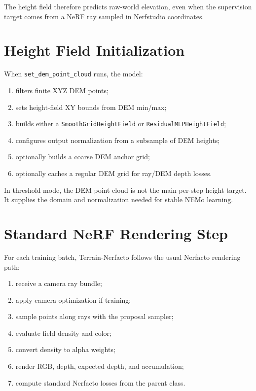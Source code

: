 \documentclass[11pt]{article}
\begin{document}
The height field therefore predicts raw-world elevation, even when the supervision target comes from a NeRF ray sampled in Nerfstudio coordinates.

\section{Height Field Initialization}

When \texttt{set\_dem\_point\_cloud} runs, the model:

\begin{enumerate}[leftmargin=*]
  \item filters finite XYZ DEM points;
  \item sets height-field XY bounds from DEM min/max;
  \item builds either a \texttt{SmoothGridHeightField} or \texttt{ResidualMLPHeightField};
  \item configures output normalization from a subsample of DEM heights;
  \item optionally builds a coarse DEM anchor grid;
  \item optionally caches a regular DEM grid for ray/DEM depth losses.
\end{enumerate}

In threshold mode, the DEM point cloud is not the main per-step height target. It supplies the domain and normalization needed for stable NEMo learning.

\section{Standard NeRF Rendering Step}

For each training batch, Terrain-Nerfacto follows the usual Nerfacto rendering path:

\begin{enumerate}[leftmargin=*]
  \item receive a camera ray bundle;
  \item apply camera optimization if training;
  \item sample points along rays with the proposal sampler;
  \item evaluate field density and color;
  \item convert density to alpha weights;
  \item render RGB, depth, expected depth, and accumulation;
  \item compute standard Nerfacto losses from the parent class.
\end{enumerate}
\end{document}
